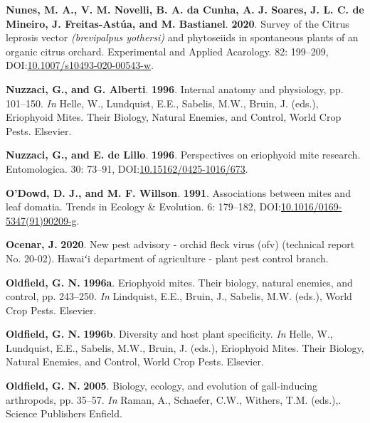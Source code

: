 \documentclass[12pt,final,CPage]{ufthesis}
\newlength{\cslhangindent}
\newenvironment{CSLReferences}[2] %
{%
	\setlength{\parindent}{0pt}
	\ifodd #1 \everypar{\setlength{\hangindent}{\cslhangindent}}\ignorespaces\fi
	\ifnum #2 > 0
	\setlength{\parskip}{#2\baselineskip}
	\fi
}%
{}
\begin{document}
{\begin{CSLReferences}{1}{0}
  \leavevmode{}%
  \textbf{Nunes, M. A., V. M. Novelli, B. A. da Cunha, A. J. Soares, J. L. C. de Mineiro, J. Freitas-Astúa, and M. Bastianel}. \textbf{2020}. Survey of the {Citrus leprosis} vector \emph{(brevipalpus yothersi)} and phytoseiids in spontaneous plants of an organic citrus orchard. Experimental and Applied Acarology. 82: 199--209, DOI:\href{https://doi.org/10.1007/s10493-020-00543-w}{10.1007/s10493-020-00543-w}.

  \leavevmode{}%
  \textbf{Nuzzaci, G., and G. Alberti}. \textbf{1996}. Internal anatomy and physiology, pp. 101--150. \emph{In} Helle, W., Lundquist, E.E., Sabelis, M.W., Bruin, J. (eds.), Eriophyoid Mites. Their Biology, Natural Enemies, and Control, World Crop Pests. Elsevier.

  \leavevmode{}%
  \textbf{Nuzzaci, G., and E. de Lillo}. \textbf{1996}. Perspectives on eriophyoid mite research. Entomologica. 30: 73--91, DOI:\href{https://doi.org/10.15162/0425-1016/673}{10.15162/0425-1016/673}.

  \leavevmode{}%
  \textbf{O'Dowd, D. J., and M. F. Willson}. \textbf{1991}. Associations between mites and leaf domatia. Trends in Ecology {\&} Evolution. 6: 179--182, DOI:\href{https://doi.org/10.1016/0169-5347(91)90209-g}{10.1016/0169-5347(91)90209-g}.

  \leavevmode{}%
  \textbf{Ocenar, J.} \textbf{2020}. New pest advisory - orchid fleck virus (ofv) (technical report No. 20-02). Hawaiʻi department of agriculture - plant pest control branch.

  \leavevmode{}%
  \textbf{Oldfield, G. N.} \textbf{1996a}. Eriophyoid mites. Their biology, natural enemies, and control, pp. 243--250. \emph{In} Lindquist, E.E., Bruin, J., Sabelis, M.W. (eds.), World Crop Pests. Elsevier.

  \leavevmode{}%
  \textbf{Oldfield, G. N.} \textbf{1996b}. Diversity and host plant specificity. \emph{In} Helle, W., Lundquist, E.E., Sabelis, M.W., Bruin, J. (eds.), Eriophyoid Mites. Their Biology, Natural Enemies, and Control, World Crop Pests. Elsevier.

  \leavevmode{}%
  \textbf{Oldfield, G. N.} \textbf{2005}. Biology, ecology, and evolution of gall-inducing arthropods, pp. 35--57. \emph{In} Raman, A., Schaefer, C.W., Withers, T.M. (eds.),. Science Publishers Enfield.


\end{CSLReferences}}
\end{document}
